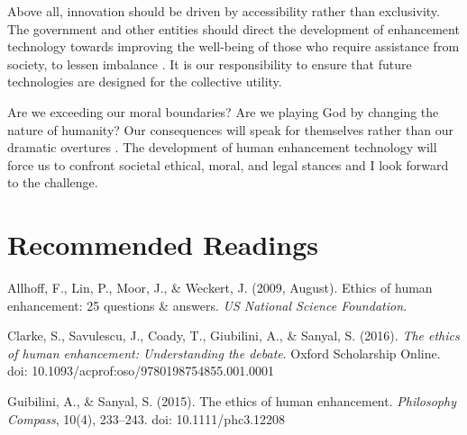 \documentclass[10pt, oneside, letterpaper]{article}
\begin{document}
\begin{multicols}{2}
	Above all, innovation should be driven by accessibility rather than exclusivity. The government and other entities should direct the development of enhancement technology towards improving the well-being of those who require assistance from society, to lessen imbalance \cite{Moore2005}. It is our responsibility to ensure that future technologies are designed for the collective utility.
	
	Are we exceeding our moral boundaries? Are we playing God by changing the nature of humanity? Our consequences will speak for themselves rather than our dramatic overtures \cite{Clarke2016}. The development of human enhancement technology will force us to confront societal ethical, moral, and legal stances and I look forward to the challenge.
	
	\section{Recommended Readings}
	
	\noindent \hangindent=0.5cm
	Allhoff, F., Lin, P., Moor, J., \& Weckert, J. (2009, August). Ethics of human enhancement: 25 questions \& answers. \textit{US National Science Foundation.}
	
	\noindent \hangindent=0.5cm
	Clarke, S., Savulescu, J., Coady, T., Giubilini, A., \& Sanyal, S. (2016). \textit{The ethics of human enhancement: Understanding the debate}. Oxford Scholarship Online. doi: 10.1093/acprof:oso/9780198754855.001.0001
	
	\noindent \hangindent=0.5cm
	Guibilini, A., \& Sanyal, S. (2015). The ethics of human enhancement. \textit{Philosophy Compass}, 10(4), 233–243. doi: 10.1111/phc3.12208
	
	\end{multicols}
	
	
	
	
\end{document}
